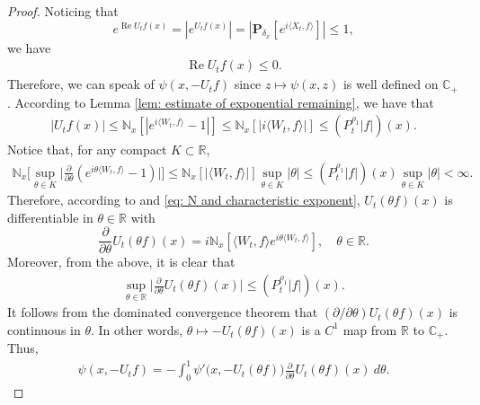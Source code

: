 \documentclass[12pt,a4paper]{amsart}
\theoremstyle{plain}
\theoremstyle{definition}
\numberwithin{equation}{section}
\begin{document}
\begin{proof}
  Noticing that
  \[
    e^{\operatorname{Re} U_tf(x)}
    = |e^{U_tf(x)}|
    = |\mathbf P_{\delta_x}[e^{i \langle X_t, f\rangle}]|
    \leq 1,
  \]
  we have
  \begin{align}
    \label{eq: -v has positive real part}
    \operatorname{Re} U_tf(x)
    \leq 0.
  \end{align}
  Therefore, we can speak of $\psi(x,-U_tf)$ since $z\mapsto \psi(x,z)$ is well defined on $\mathbb C_+$.
  According to Lemma \ref{lem: estimate of exponential remaining}, we have that
  \begin{align}
    \label{eq: upper bound for vf}
    |U_tf(x)|
    \leq \mathbb N_x[|e^{i \langle W_t, f\rangle} - 1|]
    \leq \mathbb N_x[|i \langle W_t, f\rangle|]
    \leq (P^{\rho_1}_t |f|)(x).
  \end{align}
  Notice that, for any compact $K \subset \mathbb R$,
  \begin{align}
    \label{eq: estimate of deriavetive of v(theta)}
    \mathbb N_x \Big[\sup_{\theta \in K} \Big|\frac{\partial}{\partial \theta} (e^{i\theta \langle W_t, f\rangle} - 1) \Big|\Big]
    \leq \mathbb N_x[|\langle W_t, f\rangle|] \sup_{\theta \in K}|\theta|
    \leq (P^{\rho_1}_t |f|)(x) \sup_{\theta \in K}|\theta| < \infty.
  \end{align}
  Therefore, according to \cite[Theorem A.5.2]{Durrett2010Probability} and \eqref{eq: N and characteristic exponent}, $ U_t( \theta f)( x )$ is differentiable in $\theta \in \mathbb R$ with
  \[
    \frac{\partial}{\partial \theta} U_t(\theta f)(x)
    = i\mathbb N_x[\langle W_t, f\rangle e^{i\theta \langle W_t, f\rangle}],
    \quad \theta \in \mathbb R.
  \]
  Moreover, from the above, it is clear that
  \begin{align}
    \label{eq: upper bounded for derivative of v(theta)}
    \sup_{\theta \in \mathbb R}\Big| \frac{\partial}{\partial \theta}U_t(\theta f)(x)\Big|
    \leq ( P^{\rho_1}_t |f|)(x).
  \end{align}
  It follows from the dominated convergence theorem that $(\partial/\partial \theta)U_t(\theta f)(x)$ is continuous in $\theta$.
  In other words, $\theta \mapsto -U_t(\theta f)(x)$ is a $C^1$ map from $\mathbb R$ to $\mathbb C_+$.
  Thus,
  \begin{align}
    \label{eq: path integration representation of psi(v)}
    \psi(x,-U_tf)
    = -\int_0^1 \psi'\big(x,-U_t(\theta f)\big) \frac{\partial}{\partial \theta} U_t(\theta f)(x)~d\theta.
  \end{align}

\end{proof}
\end{document}
